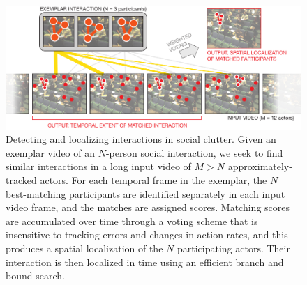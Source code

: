 \begin{figure}[t]
\begin{center}
\includegraphics[width=\columnwidth]{voting.pdf}
\end{center}
\caption{Detecting and localizing interactions in social clutter. Given an exemplar video of an $N$-person social interaction, we seek to find similar interactions in a long input video of $M>N$ approximately-tracked actors. For each temporal frame in the exemplar, the $N$ best-matching participants are identified separately in each input video frame, and the matches are assigned scores. Matching scores are accumulated over time through a voting scheme that is insensitive to tracking errors and changes in action rates, and this produces a spatial localization of the $N$ participating actors. Their interaction is then localized in time using an efficient branch and bound search.}
\label{diagram}
\end{figure}


